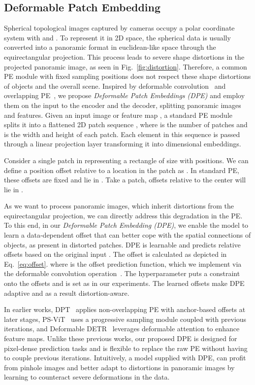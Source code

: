 \documentclass[final]{cvpr}
\begin{document}
\subsection{Deformable Patch Embedding}
\label{sec:dpe}
Spherical topological images captured by  cameras occupy a polar coordinate system with  and . To represent it in 2D space, the spherical data is usually converted into a panoramic format in euclidean-like space through the equirectangular projection.
This process leads to severe shape distortions in the projected panoramic image, as seen in Fig.~\ref{fig:distortion}.
Therefore, a common PE module with fixed sampling positions does not respect these shape distortions of objects and the overall scene. 
Inspired by deformable convolution~\cite{dai2017deformable} and overlapping PE~\cite{segformer}, we propose \emph{Deformable Patch Embeddings (DPE)} and employ them on the input to the encoder and the decoder, splitting panoramic images and features.
Given an input image or feature map , a standard PE module~\cite{vit,segformer} splits it into a flattened 2D patch sequence , where  is the number of patches and  is the width and height of each patch.
Each element in this sequence is passed through a linear projection layer transforming it into  dimensional embeddings.

Consider a single patch in  representing a rectangle of size  with  positions. We can define a position offset relative to a location  in the patch as .  
In standard PE, these offsets are fixed and lie in .
Take \eg a  patch, offsets  relative to the center will lie in .

As we want to process panoramic images, which inherit distortions from the equirectangular projection, we can directly address this degradation in the PE.
To this end, in our \emph{Deformable Patch Embedding (DPE)}, we enable the model to learn a data-dependent offset  that can better cope with the spatial connections of objects, as present in distorted patches.
DPE is learnable and predicts relative offsets based on the original input .
The offset  is calculated as depicted in Eq.~\eqref{eq:offset}. 
where  is the offset prediction function, which we implement via the deformable convolution operation~\cite{dai2017deformable}. The hyperparameter  puts a constraint onto the offsets and is set as  in our experiments. 
The learned offsets make DPE adaptive and as a result distortion-aware. 

In earlier works, DPT~\cite{chen2021dpt} applies non-overlapping PE with anchor-based offsets at later stages, PS-ViT~\cite{yue2021psvit} uses a progressive sampling module coupled with previous iterations, and Deformable DETR~\cite{deformable_detr} leverages deformable attention to enhance feature maps.
Unlike these previous works, our proposed DPE is designed for pixel-dense prediction tasks and is flexible to replace the raw PE without having to couple previous iterations. 
Intuitively, a model supplied with DPE, can profit from pinhole images and better adapt to distortions in panoramic images by learning to counteract severe deformations in the data.
\end{document}
